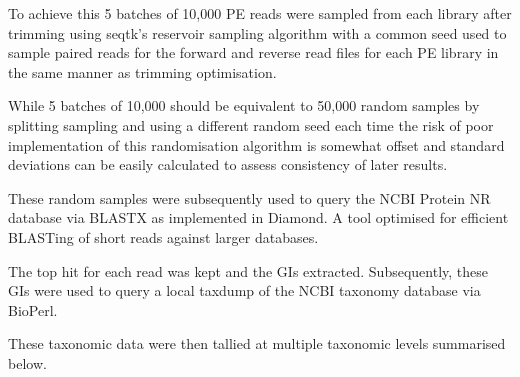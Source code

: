 To achieve this 5 batches of 10,000 PE reads were sampled from each library after trimming %
using seqtk's \citep{SeqtkGitHub} reservoir sampling algorithm with a common seed used to sample paired
reads for the forward and reverse read files for each PE library in the same manner as trimming optimisation.

While 5 batches of 10,000 should be equivalent to 50,000 random samples by splitting sampling and using
a different random seed each time the risk of poor implementation of this randomisation algorithm is 
somewhat offset and standard deviations can be easily calculated to assess consistency of later results.

These random samples were subsequently used to query the NCBI Protein NR database via BLASTX as implemented
in Diamond.  A tool optimised for efficient BLASTing of short reads against larger databases.

The top hit for each read was kept and the GIs extracted.  Subsequently, these GIs were used to query
a local taxdump of the NCBI taxonomy database via BioPerl.

These taxonomic data were then tallied at multiple taxonomic levels summarised below.




